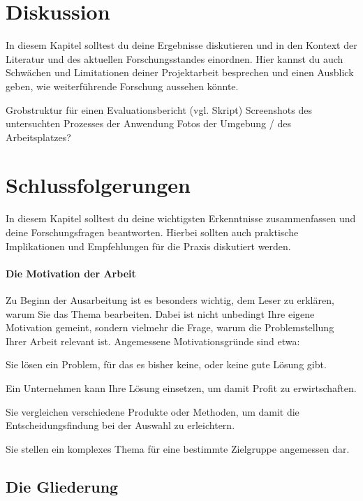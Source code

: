 \section{Diskussion}
In diesem Kapitel solltest du deine Ergebnisse diskutieren und in den Kontext der Literatur und des aktuellen Forschungsstandes einordnen. Hier kannst du auch Schwächen und Limitationen deiner Projektarbeit besprechen und einen Ausblick geben, wie weiterführende Forschung aussehen könnte.

Grobstruktur für einen Evaluationsbericht (vgl. Skript)
Screenshots des untersuchten Prozesses der Anwendung
Fotos der Umgebung / des Arbeitsplatzes?

\section{Schlussfolgerungen}
In diesem Kapitel solltest du deine wichtigsten Erkenntnisse zusammenfassen und deine Forschungsfragen beantworten. Hierbei sollten auch praktische Implikationen und Empfehlungen für die Praxis diskutiert werden.

\paragraph{Die Motivation der Arbeit}

Zu Beginn der Ausarbeitung ist es besonders wichtig, dem Leser zu erklären, warum Sie das Thema bearbeiten.
Dabei ist nicht unbedingt Ihre eigene Motivation gemeint, sondern vielmehr die Frage, warum die Problemstellung Ihrer Arbeit relevant ist.
Angemessene Motivationsgründe sind etwa:
\begin{compactitem}
\item Sie lösen ein Problem, für das es bisher keine, oder keine gute Lösung gibt.
\item Ein Unternehmen kann Ihre Lösung einsetzen, um damit Profit zu erwirtschaften.
\item Sie vergleichen verschiedene Produkte oder Methoden, um damit die Entscheidungsfindung bei der Auswahl zu erleichtern.
\item Sie stellen ein komplexes Thema für eine bestimmte Zielgruppe angemessen dar.
\end{compactitem}


\subsection{Die Gliederung}
\label{sec:gliederung}

